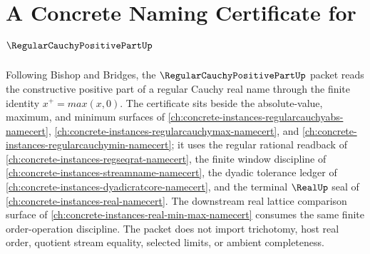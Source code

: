 \chapter{A Concrete Naming Certificate for $\RegularCauchyPositivePartUp$}
\label{ch:concrete-instances-regular-cauchy-positive-part-namecert}

Following Bishop and Bridges, the $\RegularCauchyPositivePartUp$ packet reads the constructive positive part of a regular Cauchy real name through the finite identity $x^{+}=max(x,0)$. The certificate sits beside the absolute-value, maximum, and minimum surfaces of \autoref{ch:concrete-instances-regularcauchyabs-namecert}, \autoref{ch:concrete-instances-regularcauchymax-namecert}, and \autoref{ch:concrete-instances-regularcauchymin-namecert}; it uses the regular rational readback of \autoref{ch:concrete-instances-regseqrat-namecert}, the finite window discipline of \autoref{ch:concrete-instances-streamname-namecert}, the dyadic tolerance ledger of \autoref{ch:concrete-instances-dyadicratcore-namecert}, and the terminal $\RealUp$ seal of \autoref{ch:concrete-instances-real-namecert}. The downstream real lattice comparison surface of \autoref{ch:concrete-instances-real-min-max-namecert} consumes the same finite order-operation discipline. The packet does not import trichotomy, host real order, quotient stream equality, selected limits, or ambient completeness.

